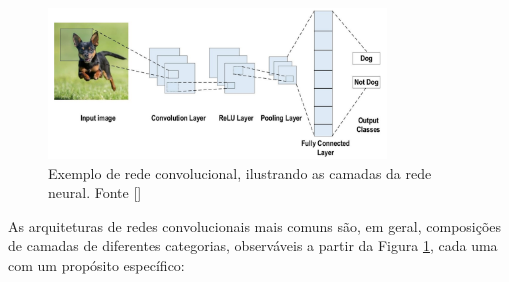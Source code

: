 \begin{figure}
    \centering
    \includegraphics[width=0.8\textwidth]{figs/theory-cnn-example.png}
    \caption{Exemplo de rede convolucional, ilustrando as camadas da rede neural. Fonte []}
    \label{fig:theory-cnn-example}
\end{figure}

As arquiteturas de redes convolucionais mais comuns são, em geral, composições de camadas de diferentes categorias, observáveis 
a partir da Figura \ref{fig:theory-cnn-example}, cada uma com um propósito específico:

